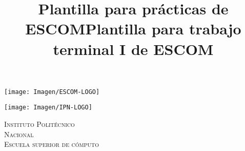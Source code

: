 \documentclass[10pt]{article}
\title{Plantilla para prácticas de ESCOM}
\title{Plantilla para trabajo terminal I de ESCOM}
\begin{document}
\begin{center}                                                                      %
\newcommand{\HRule}{\rule{\linewidth}{0.5mm}}                                   %
\begin{minipage}{0.48\textwidth} \begin{flushleft}
\texttt{[image: Imagen/ESCOM-LOGO]}
\end{flushleft}\end{minipage}
\begin{minipage}{0.48\textwidth} \begin{flushright}
\texttt{[image: Imagen/IPN-LOGO]}
\end{flushright}\end{minipage}

\vspace*{-1.5cm}                                %
\textsc{\huge Instituto Polit\'ecnico\\ \vspace{5px} Nacional}\\[1.5cm] 

\textsc{\LARGE Escuela superior de c\'omputo}\\[1.5cm]                                                   %


\end{center}
\end{document}
